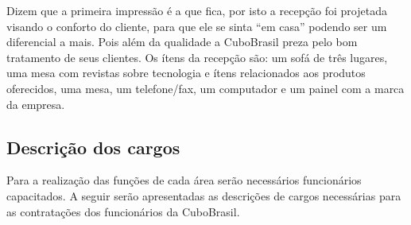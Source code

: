 \documentclass[
	12pt,				%
	openright,			%
	oneside,			%
	a4paper,			%
	english,			%
	french,				%
	spanish,			%
	brazil				%
	]{abntex2}
\begin{document}
	Dizem que a primeira impressão é a que fica, por isto a recepção foi projetada visando o conforto do cliente, para que ele se sinta “em casa” podendo ser um diferencial a mais. Pois além da qualidade a CuboBrasil preza pelo bom tratamento de seus clientes. Os ítens da recepção são: um sofá de três lugares, uma mesa com revistas sobre tecnologia e ítens relacionados aos produtos oferecidos, uma mesa, um telefone/fax, um computador e um painel com a marca da empresa.
	
\subsection[Descrição dos cargos]{Descrição dos cargos}

	Para a realização das funções de cada área serão necessários funcionários capacitados. A seguir serão apresentadas as descrições de cargos necessárias para as contratações dos funcionários da CuboBrasil.
	
\end{document}
